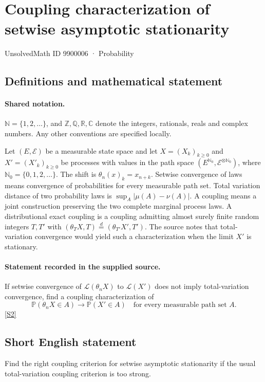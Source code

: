 \documentclass[11pt]{article}
\newcommand{\sref}[2]{\hyperlink{source:#1:#2}{[S#2]}}
\begin{document}
\setcounter{section}{9900005}
\section{Coupling characterization of setwise asymptotic stationarity}\label{9900006}
{\small\sffamily UnsolvedMath ID 9900006 · Probability}
\subsection{Definitions and mathematical statement}

\paragraph{Shared notation.}$\mathbb N=\{1,2,\ldots\}$, and $\mathbb Z,\mathbb Q,\mathbb R,\mathbb C$ denote the integers, rationals, reals and complex numbers. Any other conventions are specified locally.


Let $(E,\mathcal E)$ be a measurable state space and let $X=(X_k)_{k\ge0}$ and $X'=(X'_k)_{k\ge0}$ be processes with values in the path space $(E^{\mathbb N_0},\mathcal E^{\otimes\mathbb N_0})$, where $\mathbb N_0=\{0,1,2,\ldots\}$. The shift is $\theta_n(x)_k=x_{n+k}$. Setwise convergence of laws means convergence of probabilities for every measurable path set. Total variation distance of two probability laws is $\sup_A|\mu(A)-\nu(A)|$. A coupling means a joint construction preserving the two complete marginal process laws. A distributional exact coupling is a coupling admitting almost surely finite random integers $T,T'$ with $(\theta_TX,T)\stackrel d=(\theta_{T'}X',T')$. The source notes that total-variation convergence would yield such a characterization when the limit $X'$ is stationary.
\paragraph{Statement recorded in the supplied source.}
If setwise convergence of $\mathcal L(\theta_nX)$ to $\mathcal L(X')$ does not imply total-variation convergence, find a coupling characterization of
\[\mathbb P(\theta_nX\in A)\to\mathbb P(X'\in A)\quad\text{for every measurable path set }A.\] \sref{9900006}{2}
\subsection{Short English statement}
Find the right coupling criterion for setwise asymptotic stationarity if the usual total-variation coupling criterion is too strong.
\end{document}
